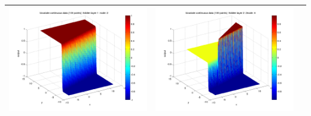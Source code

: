 \documentclass[fleqn]{article}
\begin{document}
\begin{center}
\begin{longtable}{ c | c | r }
    \includegraphics[scale=0.25]{./pics/bivariate100/_2_4/_2_4_epoch_1_hidden layer 1 :2} &   \includegraphics[scale=0.25]{./pics/bivariate100/_2_4/_2_4_epoch_1_hidden layer 2 :24} & \\
   \hline
  \end{longtable}
\end{center}
\end{document}
